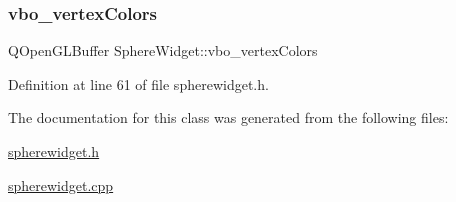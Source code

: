 \subsubsection{\texorpdfstring{vbo\+\_\+vertex\+Colors}{vbo\_vertexColors}}
{\footnotesize\ttfamily Q\+Open\+G\+L\+Buffer Sphere\+Widget\+::vbo\+\_\+vertex\+Colors\hspace{0.3cm}{\ttfamily [private]}}



Definition at line 61 of file spherewidget.\+h.



The documentation for this class was generated from the following files\+:\begin{DoxyCompactItemize}
\item 
\hyperlink{spherewidget_8h}{spherewidget.\+h}\item 
\hyperlink{spherewidget_8cpp}{spherewidget.\+cpp}\end{DoxyCompactItemize}

